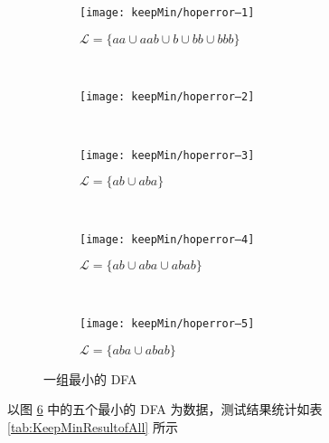 \begin{figure}[!htbp]
    \centering
    \begin{subfigure}[b]{0.49\textwidth}
        \texttt{[image: keepMin/hoperror--1]}
        \caption{$\mathcal{L}=\{aa \cup aab \cup b \cup bb \cup bbb\}$}
        \label{fig:hoperror--1}
    \end{subfigure}
    ~
    \begin{subfigure}[b]{0.49\textwidth}
        \texttt{[image: keepMin/hoperror--2]}
        \caption{}
        \label{fig:hoperror--2}
    \end{subfigure}
    \\
    \begin{subfigure}[b]{0.7\textwidth}
        \texttt{[image: keepMin/hoperror--3]}
        \caption{$\mathcal{L}=\{ab \cup aba\}$}
        \label{fig:hoperror--3}
    \end{subfigure}
    ~
    \begin{subfigure}[b]{0.7\textwidth}
        \texttt{[image: keepMin/hoperror--4]}
        \caption{$\mathcal{L}=\{ab \cup aba \cup abab\}$}
        \label{fig:hoperror--4}
    \end{subfigure}
    ~
    \begin{subfigure}[b]{0.7\textwidth}
        \texttt{[image: keepMin/hoperror--5]}
        \caption{$\mathcal{L}=\{aba \cup abab\}$}
        \label{fig:hoperror--5}
    \end{subfigure}
    \caption{一组最小的 DFA }
    \label{fig:hopcerror}
  \end{figure}

以图 \ref{fig:hopcerror} 中的五个最小的 DFA 为数据，测试结果统计如表 \ref{tab:KeepMinResultofAll} 所示

